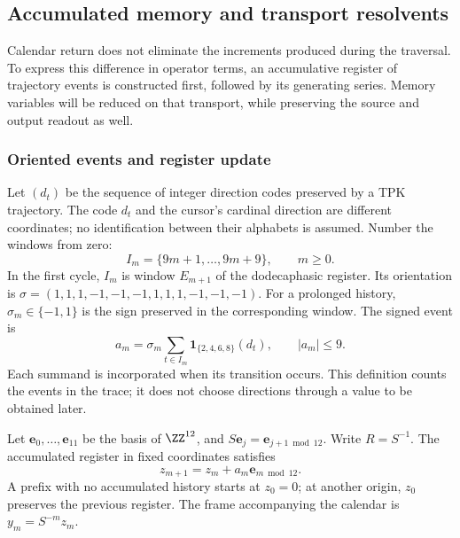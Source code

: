 \subsection{Accumulated memory and transport resolvents}
\label{subsec:memoria-resolvente}

Calendar return does not eliminate the increments produced during
the traversal. To express this difference in operator terms, an
accumulative register of trajectory events is constructed first, followed by its
generating series. Memory variables will be reduced on
that transport, while preserving the source and output readout as well.

\subsubsection{Oriented events and register update}

Let \((d_t)\) be the sequence of integer direction codes preserved
by a TPK trajectory. The code \(d_t\) and the cursor's cardinal
direction are different coordinates; no identification
between their alphabets is assumed. Number the windows from zero:
\[
 I_m=\{9m+1,\ldots,9m+9\},\qquad m\geq0.
\]
In the first cycle, \(I_m\) is window \(E_{m+1}\) of the dodecaphasic
register. Its orientation is
\(\sigma=(1,1,1,-1,-1,-1,1,1,1,-1,-1,-1)\).
For a prolonged history, \(\sigma_m\in\{-1,1\}\) is the sign
preserved in the corresponding window. The signed event is
\begin{equation}
 a_m=\sigma_m\sum_{t\in I_m}
       \mathbf1_{\{2,4,6,8\}}(d_t),\qquad |a_m|\leq9.
 \label{mem:evento}
\end{equation}
Each summand is incorporated when its transition occurs. This definition
counts the events in the trace; it does not choose directions through a value
to be obtained later.

Let \(\mathbf e_0,\ldots,\mathbf e_{11}\) be the basis of \(\ZZ^{12}\),
and \(S\mathbf e_j=\mathbf e_{j+1\bmod12}\). Write
\(R=S^{-1}\). The accumulated register in fixed coordinates satisfies
\[
z_{m+1}=z_m+a_m\mathbf e_{m\bmod12}.
\]
A prefix with no accumulated history starts at \(z_0=0\); at another
origin, \(z_0\) preserves the previous register.
The frame accompanying the calendar is \(y_m=S^{-m}z_m\).

